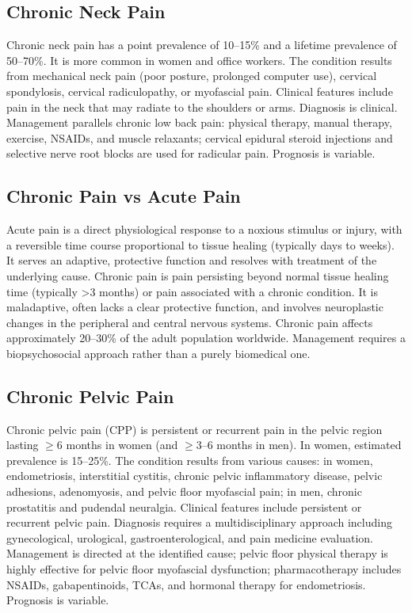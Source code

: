 \subsection{Chronic Neck Pain}
\label{sec:Chronic Neck Pain}
Chronic neck pain has a point prevalence of 10--15\% and a lifetime prevalence of 50--70\%. It is more common in women and office workers. The condition results from mechanical neck pain (poor posture, prolonged computer use), cervical spondylosis, cervical radiculopathy, or myofascial pain. Clinical features include pain in the neck that may radiate to the shoulders or arms. Diagnosis is clinical. Management parallels chronic low back pain: physical therapy, manual therapy, exercise, NSAIDs, and muscle relaxants; cervical epidural steroid injections and selective nerve root blocks are used for radicular pain. Prognosis is variable.

\subsection{Chronic Pain vs Acute Pain}
\label{sec:Chronic Pain vs Acute Pain}

Acute pain is a direct physiological response to a noxious stimulus or injury, with a reversible time course proportional to tissue healing (typically days to weeks). It serves an adaptive, protective function and resolves with treatment of the underlying cause. Chronic pain is pain persisting beyond normal tissue healing time (typically >3 months) or pain associated with a chronic condition. It is maladaptive, often lacks a clear protective function, and involves neuroplastic changes in the peripheral and central nervous systems. Chronic pain affects approximately 20--30\% of the adult population worldwide. Management requires a biopsychosocial approach rather than a purely biomedical one.

\subsection{Chronic Pelvic Pain}
\label{sec:Chronic Pelvic Pain}
Chronic pelvic pain (CPP) is persistent or recurrent pain in the pelvic region lasting $\ge$6 months in women (and $\ge$3--6 months in men). In women, estimated prevalence is 15--25\%. The condition results from various causes: in women, endometriosis, interstitial cystitis, chronic pelvic inflammatory disease, pelvic adhesions, adenomyosis, and pelvic floor myofascial pain; in men, chronic prostatitis and pudendal neuralgia. Clinical features include persistent or recurrent pelvic pain. Diagnosis requires a multidisciplinary approach including gynecological, urological, gastroenterological, and pain medicine evaluation. Management is directed at the identified cause; pelvic floor physical therapy is highly effective for pelvic floor myofascial dysfunction; pharmacotherapy includes NSAIDs, gabapentinoids, TCAs, and hormonal therapy for endometriosis. Prognosis is variable.

